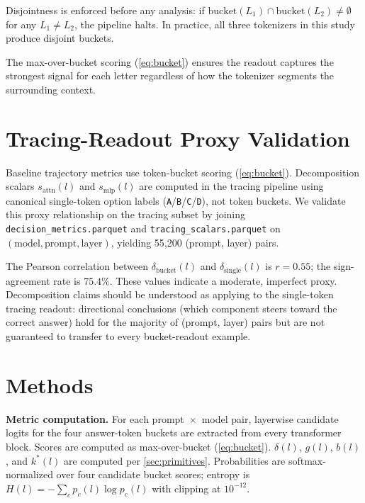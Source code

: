 \documentclass{article}
\begin{document}
Disjointness is enforced before any analysis: if $\mathrm{bucket}(L_1) \cap \mathrm{bucket}(L_2) \neq \emptyset$ for any $L_1 \neq L_2$, the pipeline halts.  In practice, all three tokenizers in this study produce disjoint buckets.

The max-over-bucket scoring (\cref{eq:bucket}) ensures the readout captures the strongest signal for each letter regardless of how the tokenizer segments the surrounding context.

\section{Tracing-Readout Proxy Validation}
\label{sec:appendix_proxy}

Baseline trajectory metrics use token-bucket scoring (\cref{eq:bucket}).  Decomposition scalars $s_{\mathrm{attn}}(l)$ and $s_{\mathrm{mlp}}(l)$ are computed in the tracing pipeline using canonical single-token option labels (\texttt{A}/\texttt{B}/\texttt{C}/\texttt{D}), not token buckets.  We validate this proxy relationship on the tracing subset by joining \texttt{decision\_metrics.parquet} and \texttt{tracing\_scalars.parquet} on $(\mathrm{model},\mathrm{prompt},\mathrm{layer})$, yielding 55{,}200 (prompt, layer) pairs.

The Pearson correlation between $\delta_{\mathrm{bucket}}(l)$ and $\delta_{\mathrm{single}}(l)$ is $r = 0.55$; the sign-agreement rate is $75.4\%$.  These values indicate a moderate, imperfect proxy.  Decomposition claims should be understood as applying to the single-token tracing readout: directional conclusions (which component steers toward the correct answer) hold for the majority of (prompt, layer) pairs but are not guaranteed to transfer to every bucket-readout example.

\section{Methods}
\label{sec:methods}

\textbf{Metric computation.}  For each prompt~$\times$~model pair, layerwise candidate logits for the four answer-token buckets are extracted from every transformer block.  Scores are computed as max-over-bucket (\cref{eq:bucket}).  $\delta(l)$, $g(l)$, $b(l)$, and $k^*(l)$ are computed per \cref{sec:primitives}.  Probabilities are softmax-normalized over four candidate bucket scores; entropy is $H(l) = -\!\sum_c p_c(l)\log p_c(l)$ with clipping at $10^{-12}$.
\end{document}
